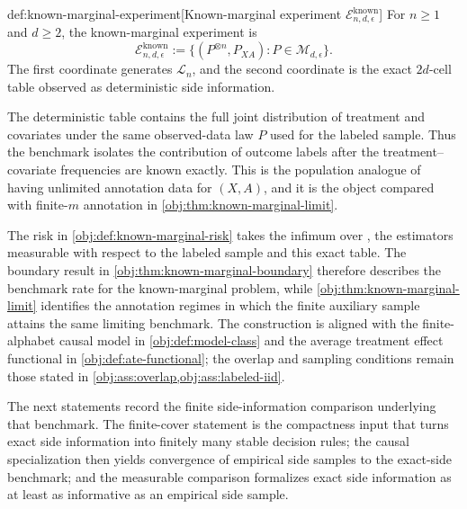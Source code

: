 \documentclass[11pt]{article}
\begin{document}
\begin{definitionv}{def:known-marginal-experiment}[Known-marginal experiment \(\mathcal E^{\mathrm{known}}_{n,d,\epsilon}\)]
For \(n\ge1\) and \(d\ge2\), the known-marginal experiment is
\[
\mathcal E^{\mathrm{known}}_{n,d,\epsilon}
:=
\{(P^{\otimes n},P_{XA}):P\in\mathcal M_{d,\epsilon}\}.
\]
The first coordinate generates \(\mathcal L_n\), and the second coordinate is the exact \(2d\)-cell table observed as deterministic side information.
\end{definitionv}

The deterministic table  contains the full joint distribution of treatment and covariates under the same observed-data law \(P\) used for the labeled sample. Thus the benchmark isolates the contribution of outcome labels after the treatment--covariate frequencies are known exactly. This is the population analogue of having unlimited annotation data for \((X,A)\), and it is the object compared with finite-\(m\) annotation in \cref{obj:thm:known-marginal-limit}.

The risk  in \cref{obj:def:known-marginal-risk} takes the infimum over , the estimators measurable with respect to the labeled sample and this exact table. The boundary result in \cref{obj:thm:known-marginal-boundary} therefore describes the benchmark rate for the known-marginal problem, while \cref{obj:thm:known-marginal-limit} identifies the annotation regimes in which the finite auxiliary sample attains the same limiting benchmark. The construction is aligned with the finite-alphabet causal model in \cref{obj:def:model-class} and the average treatment effect functional in \cref{obj:def:ate-functional}; the overlap and sampling conditions remain those stated in \cref{obj:ass:overlap,obj:ass:labeled-iid}.

The next statements record the finite side-information comparison underlying that benchmark. The finite-cover statement is the compactness input that turns exact side information into finitely many stable decision rules; the causal specialization then yields convergence of empirical side samples to the exact-side benchmark; and the measurable comparison formalizes exact side information as at least as informative as an empirical side sample.
\end{document}
